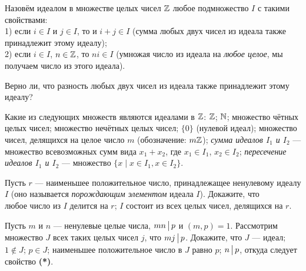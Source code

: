 \documentclass[a4paper,11pt]{article}
\begin{document}


Назовём  идеалом в множестве целых чисел $\mathbb{Z}$ любое подмножество $I$ с такими свойствами:\\
1) если $i\in I$ и $j\in I$, то и $i+j\in I$ (сумма любых двух чисел из идеала также принадлежит этому идеалу);\\
2) если $i\in I$, $n\in \mathbb{Z}$, то $ni\in I$ (умножая число из идеала на {\it любое целое}, мы получаем число из этого идеала).

Верно ли, что разность любых двух чисел из идеала также принадлежит этому идеалу?

Какие из следующих множеств являются идеалами в $\mathbb{Z}$:
 $\mathbb{Z}$;
 $\mathbb{N}$;
 множество чётных целых чисел;
 множество нечётных целых чисел;
 $\{0\}$ (нулевой идеал);
 множество чисел, делящихся на целое число $m$ (обозначение: $m\mathbb{Z}$);
 \textit{сумма идеалов $I_1$ и $I_2$} --- множество всевозможных сумм вида $x_1+ x_2$, 
где $x_1 \in I_1$, $x_2 \in I_2$;
 \textit{пересечение идеалов $I_1$ и $I_2$} --- множество $\{x \mid x\in I_1, x \in I_2\}$.


Пусть $r$ --- наименьшее положительное число, принадлежащее ненулевому идеалу $I$ (оно называется {\it порождающим элементом} идеала $I$). Докажите, что
\\
 любое число из $I$ делится на $r$;
 $I$ состоит из всех целых чисел, делящихся на $r$.

Пусть $m$ и $n$ --- ненулевые целые числа, $mn\,\bigl\rvert\, p$ и $(m,p)=1$. Рассмотрим множество $J$ всех таких целых чисел $j$, что $mj\,\bigl\rvert\, p$. Докажите, что
 $J$ --- идеал;
 $1\not \in J$; $p\in J$;
 наименьшее положительное число в $J$ равно $p$;
 $n\,\bigl\rvert\, p$, откуда следует свойство \textbf{(*)}.
\end{document}
